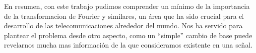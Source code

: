 En resumen, con este trabajo pudimos comprender un m\'inimo de la importancia de la transformacion de Fourier y similares,
un \'area que ha sido crucial para el desarrollo de las telecomunicaciones alrededor del mundo. Nos ha servido para plantear
el problema desde otro aspecto, como un ``simple'' cambio de base puede revelarnos mucha mas informaci\'on de la que 
consideramos existente en una se\~nal. 
